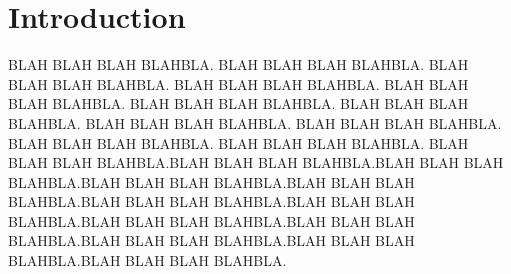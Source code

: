 \documentclass[final]{scrreprt} %
\begin{document}
\chapter{Introduction}
BLAH BLAH BLAH BLAHBLA. BLAH BLAH BLAH BLAHBLA. BLAH BLAH BLAH BLAHBLA. BLAH BLAH BLAH BLAHBLA. BLAH BLAH BLAH BLAHBLA. BLAH BLAH BLAH BLAHBLA. BLAH BLAH BLAH BLAHBLA. BLAH BLAH BLAH BLAHBLA. BLAH BLAH BLAH BLAHBLA. BLAH BLAH BLAH BLAHBLA. BLAH BLAH BLAH BLAHBLA. BLAH BLAH BLAH BLAHBLA.BLAH BLAH BLAH BLAHBLA.BLAH BLAH BLAH BLAHBLA.BLAH BLAH BLAH BLAHBLA.BLAH BLAH BLAH BLAHBLA.BLAH BLAH BLAH BLAHBLA.BLAH BLAH BLAH BLAHBLA.BLAH BLAH BLAH BLAHBLA.BLAH BLAH BLAH BLAHBLA.BLAH BLAH BLAH BLAHBLA.BLAH BLAH BLAH BLAHBLA.BLAH BLAH BLAH BLAHBLA.
\end{document}
